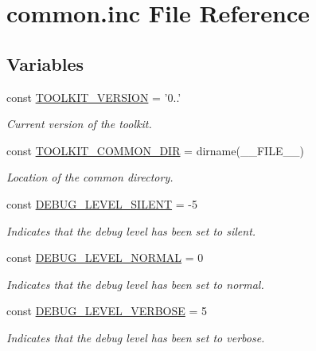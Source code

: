 \hypertarget{common_8inc}{\section{common.\-inc File Reference}
\label{common_8inc}
}
\subsection*{Variables}
\begin{DoxyCompactItemize}
\item 
const \hyperlink{common_8inc_a9eda8148b1aa1a156d4cb947a5bf4cae}{T\-O\-O\-L\-K\-I\-T\-\_\-\-V\-E\-R\-S\-I\-O\-N} = '0..'
\begin{DoxyCompactList}\small\item\em Current version of the toolkit. \end{DoxyCompactList}\item 
const \hyperlink{common_8inc_aa4d5af32469e1957022a401beed654e2}{T\-O\-O\-L\-K\-I\-T\-\_\-\-C\-O\-M\-M\-O\-N\-\_\-\-D\-I\-R} = dirname(\-\_\-\-\_\-\-F\-I\-L\-E\-\_\-\-\_\-)
\begin{DoxyCompactList}\small\item\em Location of the common directory. \end{DoxyCompactList}\item 
const \hyperlink{group__debug__levels_gad716f4611d7ac151f96d2ff10f681786}{D\-E\-B\-U\-G\-\_\-\-L\-E\-V\-E\-L\-\_\-\-S\-I\-L\-E\-N\-T} = -\/5
\begin{DoxyCompactList}\small\item\em Indicates that the debug level has been set to silent. \end{DoxyCompactList}\item 
const \hyperlink{group__debug__levels_ga412f8ed486afa7fea7c81b35d0db39ba}{D\-E\-B\-U\-G\-\_\-\-L\-E\-V\-E\-L\-\_\-\-N\-O\-R\-M\-A\-L} = 0
\begin{DoxyCompactList}\small\item\em Indicates that the debug level has been set to normal. \end{DoxyCompactList}\item 
const \hyperlink{group__debug__levels_ga3f6f7f3818bca5ef6263d121cecb584e}{D\-E\-B\-U\-G\-\_\-\-L\-E\-V\-E\-L\-\_\-\-V\-E\-R\-B\-O\-S\-E} = 5
\begin{DoxyCompactList}\small\item\em Indicates that the debug level has been set to verbose. \end{DoxyCompactList}\item 

\end{DoxyCompactItemize}
